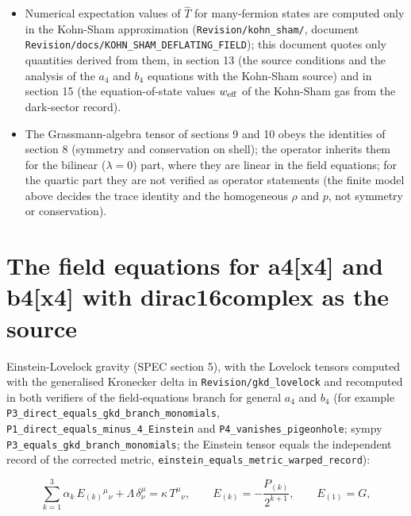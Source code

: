 \documentclass[11pt]{article}
\begin{document}
\begin{itemize}
\item Numerical expectation values of $\hat T$ for many-fermion states are computed only in the Kohn-Sham approximation (\texttt{Revision\allowbreak{}/kohn\_sh\allowbreak{}am/}, document \texttt{Revision\allowbreak{}/docs/KO\allowbreak{}HN\_SHAM\_\allowbreak{}DEFLATIN\allowbreak{}G\_FIELD}); this document quotes only quantities derived from them, in section 13 (the source conditions and the analysis of the $a_4$ and $b_4$ equations with the Kohn-Sham source) and in section 15 (the equation-of-state values $w_{\rm eff}$ of the Kohn-Sham gas from the dark-sector record).
\item The Grassmann-algebra tensor of sections 9 and 10 obeys the identities of section 8 (symmetry and conservation on shell); the operator inherits them for the bilinear ($\lambda = 0$) part, where they are linear in the field equations; for the quartic part they are not verified as operator statements (the finite model above decides the trace identity and the homogeneous $\rho$ and $p$, not symmetry or conservation).
\end{itemize}

\section{The field equations for a4[x4] and b4[x4] with dirac16complex as the source}

Einstein-Lovelock gravity (SPEC section 5), with the Lovelock tensors computed with the generalised Kronecker delta in \texttt{Revision\allowbreak{}/gkd\_lov\allowbreak{}elock} and recomputed in both verifiers of the field-equations branch for general $a_4$ and $b_4$ (for example \texttt{P3\_direc\allowbreak{}t\_equals\allowbreak{}\_gkd\_bra\allowbreak{}nch\_mono\allowbreak{}mials}, \texttt{P1\_direc\allowbreak{}t\_equals\allowbreak{}\_minus\_4\allowbreak{}\_Einstei\allowbreak{}n} and \texttt{P4\_vanis\allowbreak{}hes\_pige\allowbreak{}onhole}; sympy \texttt{P3\_equal\allowbreak{}s\_gkd\_br\allowbreak{}anch\_mon\allowbreak{}omials}; the Einstein tensor equals the independent record of the corrected metric, \texttt{einstein\allowbreak{}\_equals\_\allowbreak{}metric\_w\allowbreak{}arped\_re\allowbreak{}cord}):

\[
\sum_{k=1}^{3}\alpha_k\,E_{(k)}{}^\mu{}_\nu + \Lambda\,\delta^\mu_\nu = \kappa\,T^\mu{}_\nu,\qquad E_{(k)} = -\frac{P_{(k)}}{2^{k+1}},\qquad E_{(1)} = G,
\]
\end{document}
